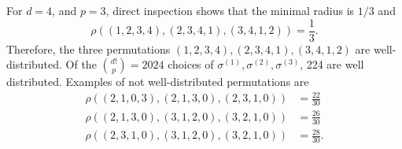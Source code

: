\begin{example}
For 
$d= 4$, 
and
$p = 3$,
direct inspection shows that 
the minimal radius
is
$1/3$
and 
\begin{equation*}
	\rho\left(
	(1, 2, 3, 4),
	(2, 3, 4, 1),
	(3, 4, 1, 2)
	\right)
	=
	\frac{1}{3}.
\end{equation*}
Therefore, 
the three permutations
$
	(1, 2, 3, 4),
	(2, 3, 4, 1),
	(3, 4, 1, 2)
$
are well-distributed. 
Of the ${d! \choose p} = 2024$ choices of 
$\sigma^{(1)}, \sigma^{(2)}, \sigma^{(3)}$,
224 are well distributed. 
Examples of not well-distributed permutations are
\begin{equation*}
	\begin{split}
	\rho\left(
	(2, 1, 0, 3),
	(2, 1, 3, 0),
	(2, 3, 1, 0)
	\right)
		& =
	\frac{22}{30}
	\\
	\rho\left(
	(2, 1, 3, 0),
	(3, 1, 2, 0),
	(3, 2, 1, 0)
	\right)
		& =
	\frac{26}{30}
	\\
	\rho\left(
	(2, 3, 1, 0),
	(3, 1, 2, 0),
	(3, 2, 1, 0)
	\right)
		& =
	\frac{28}{30}.
	\end{split}
\end{equation*}
\end{example}

